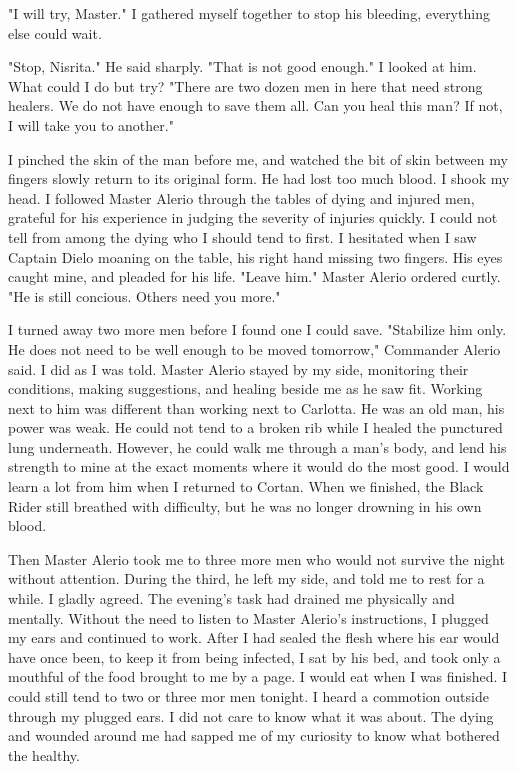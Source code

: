 \documentclass{article}
\begin{document}
"I will try, Master." I gathered myself together to stop his bleeding, everything else could wait.

"Stop, Nisrita." He said sharply. "That is not good enough." I looked at him. What could I do but try? "There are two dozen men in here that need strong healers. We do not have enough to save them all. Can you heal this man? If not, I will take you to another."

I pinched the skin of the man before me, and watched the bit of skin between my fingers slowly return to its original form. He had lost too much blood. I shook my head. I followed Master Alerio through the tables of dying and injured men, grateful for his experience in judging the severity of injuries quickly. I could not tell from among the dying who I should tend to first. I hesitated when I saw Captain Dielo moaning on the table, his right hand missing two fingers. His eyes caught mine, and pleaded for his life. "Leave him." Master Alerio ordered curtly. "He is still concious. Others need you more."

I turned away two more men before I found one I could save. "Stabilize him only. He does not need to be well enough to be moved tomorrow," Commander Alerio said. I did as I was told. Master Alerio stayed by my side, monitoring their conditions, making suggestions, and healing beside me as he saw fit. Working next to him was different than working next to Carlotta. He was an old man, his power was weak. He could not tend to a broken rib while I healed the punctured lung underneath. However, he could walk me through a man's body, and lend his strength to mine at the exact moments where it would do the most good. I would learn a lot from him when I returned to Cortan. When we finished, the Black Rider still breathed with difficulty, but he was no longer drowning in his own blood.

Then Master Alerio took me to three more men who would not survive the night without attention. During the third, he left my side, and told me to rest for a while. I gladly agreed. The evening's task had drained me physically and mentally. Without the need to listen to Master Alerio's instructions, I plugged my ears and continued to work. After I had sealed the flesh where his ear would have once been, to keep it from being infected, I sat by his bed, and took only a mouthful of the food brought to me by a page. I would eat when I was finished. I could still tend to two or three mor men tonight. I heard a commotion outside through my plugged ears. I did not care to know what it was about. The dying and wounded around me had sapped me of my curiosity to know what bothered the healthy. 
\end{document}
